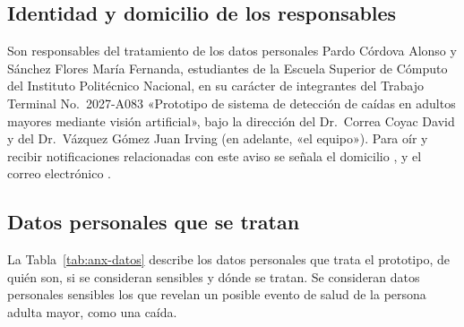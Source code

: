 \documentclass[12pt,a4paper,oneside]{book}
\theoremstyle{plain}
\theoremstyle{definition}
\theoremstyle{remark}
\begin{document}
\subsection{Identidad y domicilio de los responsables}

Son responsables del tratamiento de los datos personales Pardo Córdova Alonso y Sánchez Flores María Fernanda, estudiantes de la Escuela Superior de Cómputo del Instituto Politécnico Nacional, en su carácter de integrantes del Trabajo Terminal No.~2027-A083 «Prototipo de sistema de detección de caídas en adultos mayores mediante visión artificial», bajo la dirección del Dr.~Correa Coyac David y del Dr.~Vázquez Gómez Juan Irving (en adelante, «el equipo»). Para oír y recibir notificaciones relacionadas con este aviso se señala el domicilio \domicilioAviso, y el correo electrónico \correoAviso.

\subsection{Datos personales que se tratan}

La Tabla~\ref{tab:anx-datos} describe los datos personales que trata el prototipo, de quién son, si se consideran sensibles y dónde se tratan. Se consideran datos personales sensibles los que revelan un posible evento de salud de la persona adulta mayor, como una caída.
\end{document}
